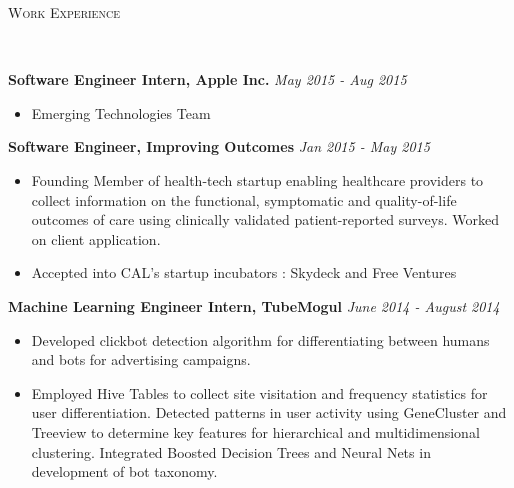 \documentclass[9pt]{extarticle}
\newenvironment{changemargin}[2]{%
  \begin{list}{}{%
    \setlength{\topsep}{0pt}%
    \setlength{\leftmargin}{#1}%
    \setlength{\rightmargin}{#2}%
    \setlength{\listparindent}{\parindent}%
    \setlength{\itemindent}{\parindent}%
    \setlength{\parsep}{\parskip}%
  }%
  \item[]}{\end{list}
}
\newcommand{\lineover}{
	\begin{changemargin}{-0.05in}{-0.05in}
		\vspace*{-8pt}
		\hrulefill \\
		\vspace*{-2pt}
	\end{changemargin}
}
\newcommand{\header}[1]{
    \vspace{5pt}
	\begin{changemargin}{-0.5in}{-0.5in}
		\scshape{#1}\\
  	\lineover
	\end{changemargin}
	\vspace{5pt}
}
\newenvironment{body} {
	\vspace*{-9pt}
	\begin{changemargin}{-0.5in}{-0.5in}
  }	
	{\end{changemargin}
}
\begin{document}
\vspace*{-5pt}
\header{Work Experience}
\begin{body}
	\vspace{1pt}
	\textbf{Software Engineer Intern, Apple Inc.} \hfill \emph{May 2015 - Aug 2015}\\
	\vspace*{-6pt}
	\begin{itemize}
		\itemsep -0pt
		\item[] Emerging Technologies Team
	\end{itemize}
	
		\vspace{1pt}
	\textbf{Software Engineer, Improving Outcomes} \hfill \emph{Jan 2015 - May 2015}\\
	\vspace*{-6pt}
	\begin{itemize}
		\itemsep -0pt
		\item[] Founding Member of health-tech startup enabling healthcare providers to collect information on the functional, symptomatic and quality-of-life outcomes of care using clinically validated patient-reported surveys. Worked on client application.
		\item[] Accepted into CAL's startup incubators : Skydeck and Free Ventures
	\end{itemize}

    
    \textbf{Machine Learning Engineer Intern, TubeMogul} 
     \hfill \emph{June 2014 - August 2014}\\
	\vspace*{-6pt}
	\begin{itemize} \itemsep -0pt  %
		\item[] Developed clickbot detection algorithm for differentiating between humans and bots for advertising campaigns. 
		\item[] Employed Hive Tables to collect site visitation and frequency statistics for user differentiation. Detected patterns in user activity using GeneCluster and Treeview to determine key features for hierarchical and multidimensional clustering. Integrated Boosted Decision Trees and Neural Nets in development of bot taxonomy. 
	\end{itemize}
    	

\end{body}
\end{document}
